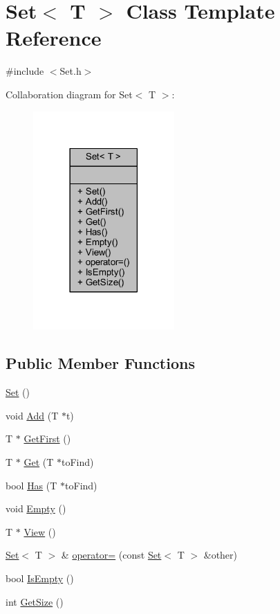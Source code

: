 \hypertarget{class_set}{}\section{Set$<$ T $>$ Class Template Reference}
\label{class_set}


{\ttfamily \#include $<$Set.\+h$>$}



Collaboration diagram for Set$<$ T $>$\+:\nopagebreak
\begin{figure}[H]
\begin{center}
\leavevmode
\includegraphics[width=153pt]{class_set__coll__graph}
\end{center}
\end{figure}
\subsection*{Public Member Functions}
\begin{DoxyCompactItemize}
\item 
\hyperlink{class_set_ac57fb2ceddf11dad44bcd9329265580d}{Set} ()
\item 
void \hyperlink{class_set_afc630403d8cd371e244ff4c425b40edf}{Add} (T $\ast$t)
\item 
T $\ast$ \hyperlink{class_set_ad9d6a75a557bc4db0578f18675f7517b}{Get\+First} ()
\item 
T $\ast$ \hyperlink{class_set_a6afa992f88acf67a53ae98e7856a9266}{Get} (T $\ast$to\+Find)
\item 
bool \hyperlink{class_set_a48747d0c4789b12fa690fa262e5bf361}{Has} (T $\ast$to\+Find)
\item 
void \hyperlink{class_set_a747da8b4e20a30c1fe7e5e1fd61881aa}{Empty} ()
\item 
T $\ast$ \hyperlink{class_set_af64cceb23979b91751faef3a05c9f698}{View} ()
\item 
\hyperlink{class_set}{Set}$<$ T $>$ \& \hyperlink{class_set_aebe57fae183aa83c69d36d24d26234b1}{operator=} (const \hyperlink{class_set}{Set}$<$ T $>$ \&other)
\item 
bool \hyperlink{class_set_ac0ef2fc243b8e89c6c77485203cde754}{Is\+Empty} ()
\item 
int \hyperlink{class_set_a3638f81fb2a7b08e6f0e2ecd5543f85c}{Get\+Size} ()
\end{DoxyCompactItemize}


